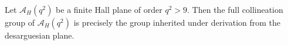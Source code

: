 Let $\mathcal{A}_H(q^2)$ be a finite Hall plane of order $q^2 > 9$. Then the full collineation group of $\mathcal{A}_H(q^2)$ is precisely the group inherited under derivation from the desarguesian plane.
